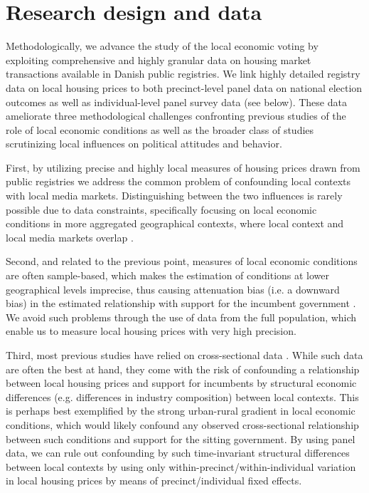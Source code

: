\documentclass[12pt,a4paper]{article}
\begin{document}
	\section{Research design and data}\label{resdesign}
	
	Methodologically, we advance the study of the local economic voting by exploiting comprehensive and highly granular data on housing market transactions available in Danish public registries. We link highly detailed registry data on local housing prices to both precinct-level panel data on national election outcomes as well as individual-level panel survey data (see below). These data ameliorate three methodological challenges confronting previous studies of the role of local economic conditions as well as the broader class of studies scrutinizing local influences on political attitudes and behavior.
	
	First, by utilizing precise and highly local measures of housing prices drawn from public registries we address the common problem of confounding local contexts with local media markets. Distinguishing between the two influences is rarely possible due to data constraints, specifically focusing on local economic conditions in more aggregated geographical contexts, where local context and local media markets overlap \citep[][]{bisgaard2016reconsidering}.  
	
	Second, and related to the previous point, measures of local economic conditions are often sample-based, which makes the estimation of conditions at lower geographical levels imprecise, thus causing attenuation bias (i.e. a downward bias) in the estimated relationship with support for the incumbent government \citep[][]{healy2017presidential}. We avoid such problems through the use of data from the full population, which enable us to measure local housing prices with very high precision.
	
	Third, most previous studies have relied on cross-sectional data \citep[][]{bisgaard2016reconsidering, reeves2012ecologies, ansolabehere2014mecro, books1999contextual}. While such data are often the best at hand, they come with the risk of confounding a relationship between local housing prices and support for incumbents by structural economic differences (e.g. differences in industry composition) between local contexts. This is perhaps best exemplified by the strong urban-rural gradient in local economic conditions, which would likely confound any observed cross-sectional relationship between such conditions and support for the sitting government. By using panel data, we can rule out confounding by such time-invariant structural differences between local contexts by using only within-precinct/within-individual variation in local housing prices by means of precinct/individual fixed effects.
	
\end{document}
